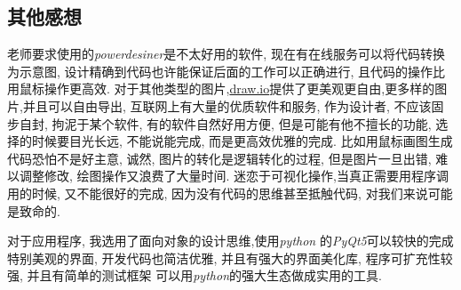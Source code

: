 \documentclass{myreport}
\begin{document}
  \subsection{其他感想}

    老师要求使用的\emph{powerdesiner}是不太好用的软件,
    现在有在线服务可以将代码转换为示意图,
    设计精确到代码也许能保证后面的工作可以正确进行,
    且代码的操作比用鼠标操作更高效.
    对于其他类型的图片,\url{draw.io}提供了更美观更自由,更多样的图片,并且可以自由导出,
    互联网上有大量的优质软件和服务,
    作为设计者, 不应该固步自封, 拘泥于某个软件,
    有的软件自然好用方便, 但是可能有他不擅长的功能,
    选择的时候要目光长远, 不能说能完成,
    而是更高效优雅的完成.
    比如用鼠标画图生成代码恐怕不是好主意,
    诚然, 图片的转化是逻辑转化的过程,
    但是图片一旦出错, 难以调整修改,
    绘图操作又浪费了大量时间.
    迷恋于可视化操作,当真正需要用程序调用的时候,
    又不能很好的完成,
    因为没有代码的思维甚至抵触代码,
    对我们来说可能是致命的.


    对于应用程序, 我选用了面向对象的设计思维,使用\emph{python}
    的\emph{PyQt5}可以较快的完成特别美观的界面,
    开发代码也简洁优雅, 并且有强大的界面美化库,
    程序可扩充性较强,
    并且有简单的测试框架
    可以用\emph{python}的强大生态做成实用的工具.




\end{document}
